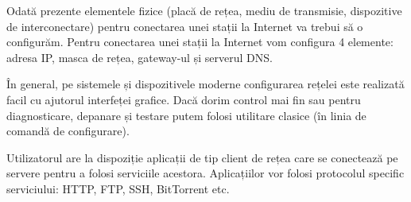 Odată prezente elementele fizice (placă de rețea, mediu de transmisie, dispozitive de interconectare) pentru conectarea unei stații la Internet va trebui să o configurăm. Pentru conectarea unei stații la Internet vom configura 4 elemente: adresa IP, masca de rețea, gateway-ul și serverul DNS.

În general, pe sistemele și dispozitivele moderne configurarea rețelei este realizată facil cu ajutorul interfeței grafice. Dacă dorim control mai fin sau pentru diagnosticare, depanare și testare putem folosi utilitare clasice (în linia de comandă de configurare).

Utilizatorul are la dispoziție aplicații de tip client de rețea care se conectează pe servere pentru a folosi serviciile acestora. Aplicațiilor vor folosi protocolul specific serviciului: HTTP, FTP, SSH, BitTorrent etc.
